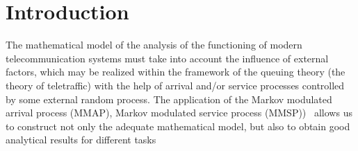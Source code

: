 {%








\maketitle

\section{Introduction}
\label{sec:intro}

The mathematical model of the analysis of the functioning of modern
telecommunication systems must take into account the influence of
external factors, which may be realized within the framework of the
queuing theory (the theory of
teletraffic)\cite{Boch,bash1,MMAP-book,5} with the help of arrival
and/or service processes controlled by some external random
process. The application of the Markov modulated arrival process
(MMAP), Markov modulated service process
(MMSP))~\cite{Neuts3,Neuts4,Neuts5,Neuts6,4,MMAP-book} allows us to
construct not only the adequate mathematical model, but also to obtain
good analytical results for different
tasks~\cite{MMPP-1998,MMPP-2005,vish,koz1,koz2,koz3,raz0,raz1,raz2,raz3,sam1,sam2,6b}

}

